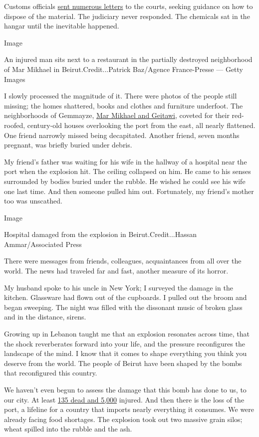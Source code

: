 Customs officials
\href{https://www.nytimes.com/2020/08/05/world/middleeast/beirut-lebanon-explosion.html}{sent
numerous letters} to the courts, seeking guidance on how to dispose of
the material. The judiciary never responded. The chemicals sat in the
hangar until the inevitable happened.

Image

An injured man sits next to a restaurant in the partially destroyed
neighborhood of Mar Mikhael in Beirut.Credit...Patrick Baz/Agence
France-Presse --- Getty Images

I slowly processed the magnitude of it. There were photos of the people
still missing; the homes shattered, books and clothes and furniture
underfoot. The neighborhoods of Gemmayze,
\href{https://www.nytimes.com/interactive/2020/08/04/world/middleeast/beirut-explosion-damage.html}{Mar
Mikhael and Geitawi}, coveted for their red-roofed, century-old houses
overlooking the port from the east, all nearly flattened. One friend
narrowly missed being decapitated. Another friend, seven months
pregnant, was briefly buried under debris.

My friend's father was waiting for his wife in the hallway of a hospital
near the port when the explosion hit. The ceiling collapsed on him. He
came to his senses surrounded by bodies buried under the rubble. He
wished he could see his wife one last time. And then someone pulled him
out. Fortunately, my friend's mother too was unscathed.

Image

Hospital damaged from the explosion in Beirut.Credit...Hassan
Ammar/Associated Press

There were messages from friends, colleagues, acquaintances from all
over the world. The news had traveled far and fast, another measure of
its horror.

My husband spoke to his uncle in New York; I surveyed the damage in the
kitchen. Glassware had flown out of the cupboards. I pulled out the
broom and began sweeping. The night was filled with the dissonant music
of broken glass and in the distance, sirens.

Growing up in Lebanon taught me that an explosion resonates across time,
that the shock reverberates forward into your life, and the pressure
reconfigures the landscape of the mind. I know that it comes to shape
everything you think you deserve from the world. The people of Beirut
have been shaped by the bombs that reconfigured this country.

We haven't even begun to assess the damage that this bomb has done to
us, to our city. At least
\href{https://www.nytimes.com/2020/08/05/world/middleeast/beirut-lebanon-explosion.html}{135
dead and 5,000} injured. And then there is the loss of the port, a
lifeline for a country that imports nearly everything it consumes. We
were already facing food shortages. The explosion took out two massive
grain silos; wheat spilled into the rubble and the ash.

